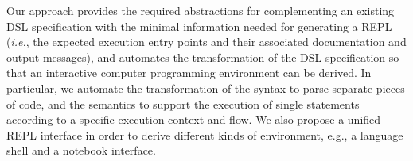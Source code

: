 Our approach provides the required abstractions for complementing an existing DSL specification with the minimal information needed for generating a REPL (\emph{i.e.}, the expected execution entry points and their associated documentation and output messages), and automates the transformation of the DSL specification so that an interactive computer programming environment can be derived. In particular, we automate the transformation of the syntax to parse separate pieces of code, and the semantics to support the execution of single statements according to a specific execution context and flow. We also propose a unified REPL interface in order to derive different kinds of environment, e.g., a language shell and a  notebook interface. 



\begin{comment}

We want to provide language designers with a way to easily obtain a REPL for their languages.
We do not, however, target languages that were made especially with interactivity in mind.
Our intent is not to replace the work that a designer would put into his own interactive language, but to enable the ones working on more traditional DSLs to still obtain some interactivity with minimal effort.
We see several advantages to having a REPL for languages that were not originally intended for this kind of execution:




A REPL can circumvent this by, for example, making the print statement a valid entry-point.
By having access to an interactive environment, it becomes easier to focus on particular matters and to teach in a more incremental way.

In order to better illustrate the educational benefits of having an interactive environment available, we will use the language \textit{Logo}.


 With interactivity, the feedback becomes instantaneous, and the learning can be more incremental by reusing the existing canvas when introducing new concepts.

However, even an experienced language user can find an interest in using a REPL, since it gives the ability to test the behaviour of code snippets or whole methods at any time.
It basically becomes possible to run processes in an arbitrary order while having access to all the intermediary results, which can be very useful when experimenting with an API for example:
In some instance, an API might require to follow a rather complex protocol.
Implementing the right sequence of actions in a working process can be a terrible ordeal if the programmer needs to edit and restart the whole program after each failure.
As such, an interactive interpreter becomes the perfect tool to deal with these situations.


\end{comment}
